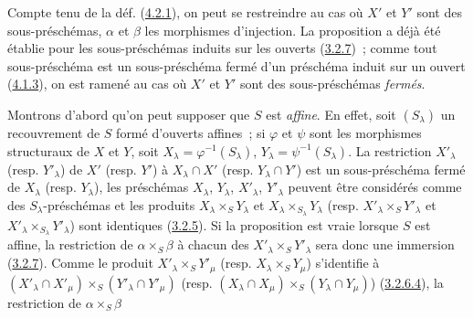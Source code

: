 Compte tenu de la déf. (\hyperref[I.4.2.1-fr]{4.2.1}), on peut se restreindre
au cas où $X'$ et $Y'$ sont des sous-préschémas, $\alpha$ et $\beta$ les
morphismes d'injection. La proposition a déjà été établie pour les
sous-préschémas induits sur les ouverts (\hyperref[I.3.2.7-fr]{3.2.7})~; comme
tout sous-préschéma est un sous-préschéma fermé d'un préschéma induit sur un
ouvert (\hyperref[I.4.1.3-fr]{4.1.3}), on est ramené au cas où $X'$ et $Y'$ sont
des sous-préschémas \emph{fermés}.

Montrons d'abord qu'on peut supposer que $S$ est \emph{affine}. En effet, soit
$(S_\lambda)$ un recouvrement de $S$ formé d'ouverts affines~; si $\varphi$ et
$\psi$ sont les morphismes structuraux de $X$ et $Y$, soit
$X_\lambda=\varphi^{-1}(S_\lambda)$, $Y_\lambda=\psi^{-1}(S_\lambda)$. La
restriction $X'_\lambda$ (resp. $Y'_\lambda$) de $X'$ (resp. $Y'$) à
$X_\lambda\cap X'$ (resp. $Y_\lambda\cap Y'$) est un sous-préschéma fermé de
$X_\lambda$ (resp. $Y_\lambda$), les préschémas $X_\lambda$, $Y_\lambda$,
$X'_\lambda$, $Y'_\lambda$ peuvent être considérés comme des
$S_\lambda$-préschémas et les produits $X_\lambda\times_S Y_\lambda$ et
$X_\lambda\times_{S_\lambda}Y_\lambda$ (resp.
$X'_\lambda\times_S Y'_\lambda$ et
$X'_\lambda\times_{S_\lambda}Y'_\lambda$) sont identiques
(\hyperref[I.3.2.5-fr]{3.2.5}). Si la proposition est vraie lorsque $S$ est
affine, la restriction de $\alpha\times_S\beta$ à chacun des
$X'_\lambda\times_S Y'_\lambda$ sera donc une immersion
(\hyperref[I.3.2.7-fr]{3.2.7}). Comme le produit
$X'_\lambda\times_S Y'_\mu$ (resp. $X_\lambda\times_S Y_\mu$) s'identifie à
$(X'_\lambda\cap X'_\mu)\times_S(Y'_\lambda\cap Y'_\mu)$ (resp.
$(X_\lambda\cap X_\mu)\times_S(Y_\lambda\cap Y_\mu)$)
(\hyperref[I.3.2.6.4-fr]{3.2.6.4}), la restriction de
$\alpha\times_S\beta$
